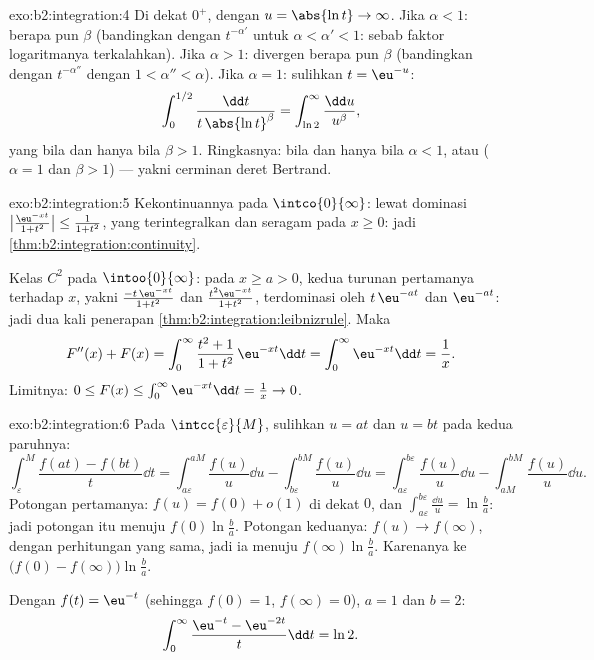\begin{solution}{exo:b2:integration:4}
Di dekat $0^+$, dengan $u = \abs{\ln t} \to \infty$. Jika $\alpha < 1$:
 berapa pun $\beta$ (bandingkan dengan $t^{-\alpha'}$ untuk
$\alpha < \alpha' < 1$: sebab faktor logaritmanya terkalahkan). Jika
$\alpha > 1$: divergen berapa pun $\beta$ (bandingkan dengan
$t^{-\alpha''}$ dengan $1 < \alpha'' < \alpha$). Jika $\alpha = 1$:
sulihkan $t = \eu^{-u}$:
\[
\int_0^{1/2} \frac{\dd t}{t\,\abs{\ln t}^\beta}
= \int_{\ln 2}^{\infty} \frac{\dd u}{u^\beta},
\]
yang  bila dan hanya bila $\beta > 1$. Ringkasnya: 
bila dan hanya bila $\alpha < 1$, atau ($\alpha = 1$ dan $\beta > 1$)
--- yakni cerminan deret Bertrand.
\end{solution}

\begin{solution}{exo:b2:integration:5}
Kekontinuannya pada $\intco{0}{\infty}$: lewat dominasi
$\bigl|\frac{\eu^{-xt}}{1+t^2}\bigr| \leq \frac{1}{1+t^2}$, yang
terintegralkan dan seragam pada $x \geq 0$: jadi
\cref{thm:b2:integration:continuity}.

Kelas $C^2$ pada $\intoo{0}{\infty}$: pada $x \geq a > 0$, kedua turunan
pertamanya terhadap $x$, yakni $\frac{-t\,\eu^{-xt}}{1+t^2}$ dan
$\frac{t^2\eu^{-xt}}{1+t^2}$, terdominasi oleh $t\,\eu^{-at}$ dan
$\eu^{-at}$: jadi dua kali penerapan
\cref{thm:b2:integration:leibnizrule}. Maka
\[
F''(x) + F(x) = \int_0^\infty \frac{t^2 + 1}{1 + t^2}\,\eu^{-xt}\dd
t = \int_0^\infty \eu^{-xt}\dd t = \frac1x .
\]
Limitnya: $0 \leq F(x) \leq \int_0^\infty \eu^{-xt}\dd t = \frac1x \to
0$.
\end{solution}

\begin{solution}{exo:b2:integration:6}
Pada $\intcc{\varepsilon}{M}$, sulihkan $u = at$ dan $u = bt$ pada
kedua paruhnya:
\[
\int_\varepsilon^M \frac{f(at) - f(bt)}{t}\dd t
= \int_{a\varepsilon}^{aM}\frac{f(u)}{u}\dd u
- \int_{b\varepsilon}^{bM}\frac{f(u)}{u}\dd u
= \int_{a\varepsilon}^{b\varepsilon} \frac{f(u)}{u}\dd u
- \int_{aM}^{bM} \frac{f(u)}{u}\dd u .
\]
Potongan pertamanya: $f(u) = f(0) + o(1)$ di dekat $0$, dan
$\int_{a\varepsilon}^{b\varepsilon} \frac{\dd u}{u} = \ln\frac ba$: jadi
potongan itu menuju $f(0)\ln\frac ba$. Potongan keduanya: $f(u) \to
f(\infty)$, dengan perhitungan yang sama, jadi ia menuju
$f(\infty)\ln\frac ba$. Karenanya   ke
$\bigl(f(0) - f(\infty)\bigr)\ln\frac ba$.

Dengan $f(t) = \eu^{-t}$ (sehingga $f(0) = 1$, $f(\infty) = 0$), $a = 1$
dan $b = 2$:
\[
\int_0^\infty \frac{\eu^{-t} - \eu^{-2t}}{t}\dd t = \ln 2 .
\]
\end{solution}


